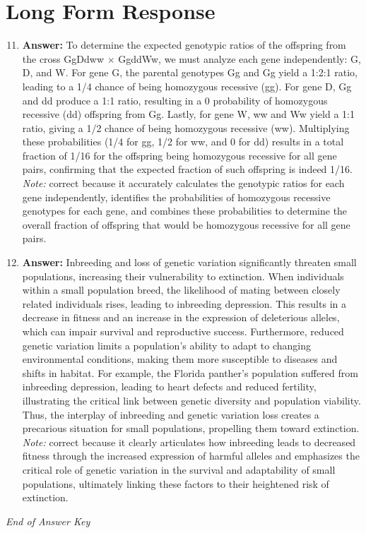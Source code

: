\documentclass[12pt]{article}
\begin{document}
\section*{Long Form Response}
\begin{enumerate}[label=\arabic*.]
\setcounter{enumi}{10}
\item \textbf{Answer:} To determine the expected genotypic ratios of the offspring from the cross GgDdww \ensuremath{\times} GgddWw, we must analyze each gene independently: G, D, and W. For gene G, the parental genotypes Gg and Gg yield a 1:2:1 ratio, leading to a 1/4 chance of being homozygous recessive (gg). For gene D, Gg and dd produce a 1:1 ratio, resulting in a 0 probability of homozygous recessive (dd) offspring from Gg. Lastly, for gene W, ww and Ww yield a 1:1 ratio, giving a 1/2 chance of being homozygous recessive (ww). Multiplying these probabilities (1/4 for gg, 1/2 for ww, and 0 for dd) results in a total fraction of 1/16 for the offspring being homozygous recessive for all gene pairs, confirming that the expected fraction of such offspring is indeed 1/16.
\\ \textit{Note:} correct because it accurately calculates the genotypic ratios for each gene independently, identifies the probabilities of homozygous recessive genotypes for each gene, and combines these probabilities to determine the overall fraction of offspring that would be homozygous recessive for all gene pairs.
\item \textbf{Answer:} Inbreeding and loss of genetic variation significantly threaten small populations, increasing their vulnerability to extinction. When individuals within a small population breed, the likelihood of mating between closely related individuals rises, leading to inbreeding depression. This results in a decrease in fitness and an increase in the expression of deleterious alleles, which can impair survival and reproductive success. Furthermore, reduced genetic variation limits a population's ability to adapt to changing environmental conditions, making them more susceptible to diseases and shifts in habitat. For example, the Florida panther's population suffered from inbreeding depression, leading to heart defects and reduced fertility, illustrating the critical link between genetic diversity and population viability. Thus, the interplay of inbreeding and genetic variation loss creates a precarious situation for small populations, propelling them toward extinction.
\\ \textit{Note:} correct because it clearly articulates how inbreeding leads to decreased fitness through the increased expression of harmful alleles and emphasizes the critical role of genetic variation in the survival and adaptability of small populations, ultimately linking these factors to their heightened risk of extinction.
\end{enumerate}

\vfill
\noindent\textit{End of Answer Key}
\end{document}
